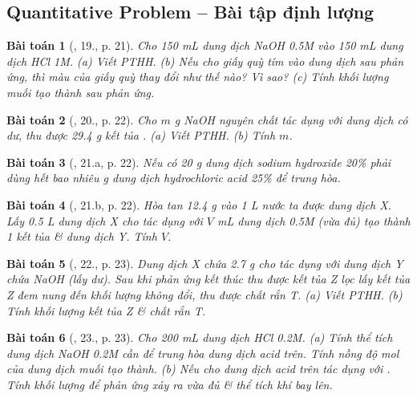 \documentclass{article}
\newtheorem{baitoan}{Bài toán}
\begin{document}
\subsection{Quantitative Problem -- Bài tập định lượng}

\begin{baitoan}[\cite{An_350_BT_Hoa_Hoc_9}, 19., p. 21]
	Cho \emph{150 mL} dung dịch \emph{NaOH 0.5M} vào \emph{150 mL} dung dịch \emph{HCl 1M}. (a) Viết PTHH. (b) Nếu cho giấy quỳ tím vào dung dịch sau phản ứng, thì màu của giấy quỳ thay đổi như thế nào? Vì sao? (c) Tính khối lượng muối tạo thành sau phản ứng.
\end{baitoan}

\begin{baitoan}[\cite{An_350_BT_Hoa_Hoc_9}, 20., p. 22]
	Cho $m$ \emph{g NaOH} nguyên chất tác dụng với dung dịch \emph{} có dư, thu được \emph{29.4 g} kết tủa \emph{}. (a) Viết PTHH. (b) Tính $m$.
\end{baitoan}

\begin{baitoan}[\cite{An_350_BT_Hoa_Hoc_9}, 21.a, p. 22]
	Nếu có \emph{20 g} dung dịch sodium hydroxide \emph{20\%} phải dùng hết bao nhiêu \emph{g} dung dịch hydrochloric acid \emph{25\%} để trung hòa.
\end{baitoan}

\begin{baitoan}[\cite{An_350_BT_Hoa_Hoc_9}, 21.b, p. 22]
	Hòa tan \emph{12.4 g } vào \emph{1 L} nước ta được dung dịch X. Lấy \emph{0.5 L} dung dịch X cho tác dụng với $V$ \emph{mL} dung dịch \emph{ 0.5M} (vừa đủ) tạo thành 1 kết tủa \& dung dịch Y. Tính $V$.
\end{baitoan}

\begin{baitoan}[\cite{An_350_BT_Hoa_Hoc_9}, 22., p. 23]
	Dung dịch X chứa \emph{2.7 g } cho tác dụng với dung dịch Y chứa \emph{NaOH} (lấy dư). Sau khi phản ứng kết thúc thu được kết tủa Z lọc lấy kết tủa Z đem nung đến khối lượng không đổi, thu được chất rắn T. (a) Viết PTHH. (b) Tính khối lượng kết tủa Z \& chất rắn T.
\end{baitoan}

\begin{baitoan}[\cite{An_350_BT_Hoa_Hoc_9}, 23., p. 23]
	Cho \emph{200 mL} dung dịch \emph{HCl 0.2M}. (a) Tính thể tích dung dịch \emph{NaOH 0.2M} cần để trung hòa dung dịch acid trên. Tính nồng độ mol của dung dịch muối tạo thành. (b) Nếu cho dung dịch acid trên tác dụng với \emph{}. Tính khối lượng \emph{} để phản ứng xảy ra vừa đủ \& thể tích khí bay lên.
\end{baitoan}
\end{document}
